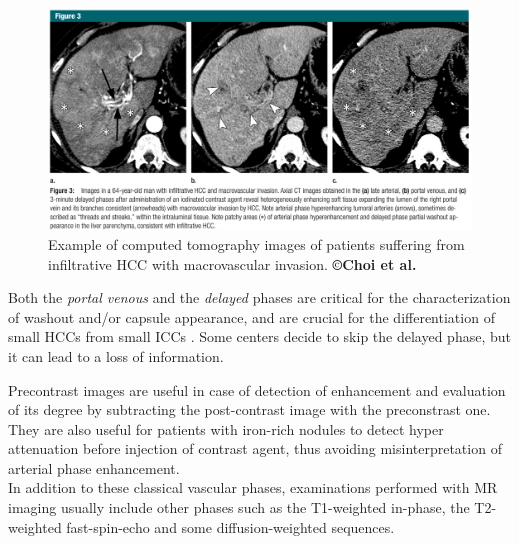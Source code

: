 \documentclass[]{article}
\begin{document}
\begin{figure}[th!]
\centering
\includegraphics[width=0.9\linewidth]{images/image15}
\caption{Example of computed tomography images of patients suffering from infiltrative HCC with macrovascular invasion. \textbf{©Choi et al.} \cite{Choi2014a}}
\label{Choi2014a_Fig3}
\end{figure}

Both the \emph{portal venous} and the \emph{delayed} phases are critical
for the characterization of washout and/or capsule appearance, and are
crucial for the differentiation of small HCCs from small
ICCs \cite{Iannaccone2005,Rimola2009}. Some centers decide
to skip the delayed phase, but it can lead to a loss of information.

Precontrast images are useful in case of detection of enhancement
and evaluation of its degree by subtracting the post-contrast image with
the preconstrast one. They are also useful for patients with iron-rich
nodules to detect hyper attenuation before injection of contrast agent,
thus avoiding misinterpretation of arterial phase enhancement.\\
In addition to these classical vascular phases, examinations performed
with MR imaging usually include other phases such as the T1-weighted
in-phase, the T2-weighted fast-spin-echo and some diffusion-weighted
sequences.\\
\end{document}

